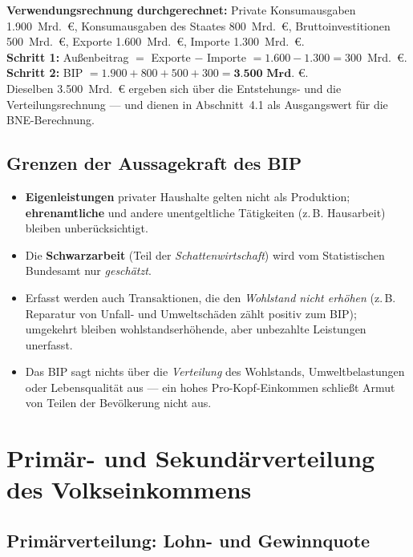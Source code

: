 \documentclass[11pt, a4paper]{article}
\begin{document}
\begin{beispiel}
\textbf{Verwendungsrechnung durchgerechnet:} Private Konsumausgaben 1.900~Mrd.~€,
Konsumausgaben des Staates 800~Mrd.~€, Bruttoinvestitionen 500~Mrd.~€, Exporte
1.600~Mrd.~€, Importe 1.300~Mrd.~€.\\[0.3em]
\textbf{Schritt 1:} Außenbeitrag $=$ Exporte $-$ Importe $= 1.600 - 1.300 = 300$~Mrd.~€.\\
\textbf{Schritt 2:} BIP $= 1.900 + 800 + 500 + 300 = \textbf{3.500~Mrd.~€}$.\\[0.3em]
Dieselben 3.500~Mrd.~€ ergeben sich über die Entstehungs- und die Verteilungsrechnung ---
und dienen in Abschnitt~4.1 als Ausgangswert für die BNE-Berechnung.
\end{beispiel}

\subsection{Grenzen der Aussagekraft des BIP}

\begin{itemize}
  \item \textbf{Eigenleistungen} privater Haushalte gelten nicht als Produktion;
    \textbf{ehrenamtliche} und andere unentgeltliche Tätigkeiten (z.\,B. Hausarbeit)
    bleiben unberücksichtigt.
  \item Die \textbf{Schwarzarbeit} (Teil der \emph{Schattenwirtschaft}) wird vom
    Statistischen Bundesamt nur \emph{geschätzt}.
  \item Erfasst werden auch Transaktionen, die den \emph{Wohlstand nicht erhöhen} (z.\,B.
    Reparatur von Unfall- und Umweltschäden zählt positiv zum BIP); umgekehrt bleiben
    wohlstandserhöhende, aber unbezahlte Leistungen unerfasst.
  \item Das BIP sagt nichts über die \emph{Verteilung} des Wohlstands, Umweltbelastungen
    oder Lebensqualität aus --- ein hohes Pro-Kopf-Einkommen schließt Armut von Teilen
    der Bevölkerung nicht aus.
\end{itemize}

\section{Primär- und Sekundärverteilung des Volkseinkommens}

\subsection{Primärverteilung: Lohn- und Gewinnquote}
\end{document}
